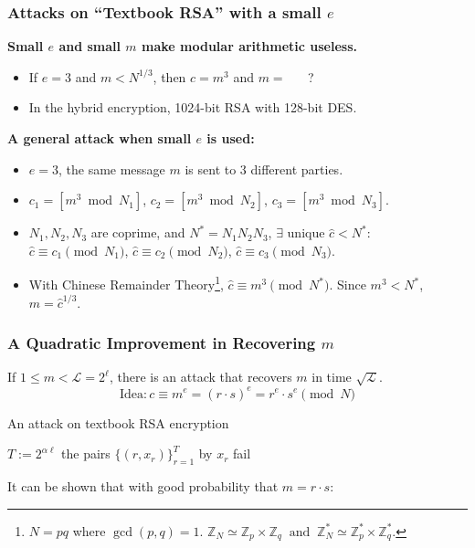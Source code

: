 \begin{frame}\frametitle{Attacks on ``Textbook RSA'' with a small $e$}
\textbf{Small $e$ and small $m$ make modular arithmetic useless.}
\begin{itemize}
\item If $e=3$ and $m < N^{1/3}$, then $c = m^3$ and \alert{$m=$ \underline{$\quad $} ?} %
\item In the hybrid encryption, 1024-bit RSA with 128-bit DES.
\end{itemize}
\textbf{A general attack when small $e$ is used:}
\begin{itemize}
\item $e=3$, the same message $m$ is sent to 3 different parties.
\item $c_1= [ m^3 \bmod N_1]$, $c_2= [ m^3 \bmod N_2]$, $c_3= [ m^3 \bmod N_3]$.
\item $N_1,N_2,N_3$ are coprime, and $N^*=N_1N_2N_3$, $\exists$ unique $\hat{c} < N^*$:\\
$\hat{c} \equiv c_1 \pmod{N_1}$, $\hat{c} \equiv c_2 \pmod{N_2}$, $\hat{c} \equiv c_3 \pmod{N_3}$.
\item With Chinese Remainder Theory\footnote{
$N = pq$ where $\gcd(p,q)=1$.
$\mathbb{Z}_N \simeq \mathbb{Z}_p \times \mathbb{Z}_q\;\;\text{and}\;\;\mathbb{Z}_N^* \simeq \mathbb{Z}_p^* \times \mathbb{Z}_q^* .$
}, $\hat{c} \equiv m^3 \pmod{N^*}$. Since $m^3 < N^*$, $m = \hat{c}^{1/3}$.
\end{itemize}
\end{frame}
\begin{frame}\frametitle{A Quadratic Improvement in Recovering $m$}
If $1 \le m < \mathcal{L} = 2^{\ell}$, there is an attack that recovers $m$  in time $\sqrt{\mathcal{L}}$.
\[ \text{Idea}: c \equiv m^e = (r\cdot s)^e = r^e\cdot s^e \pmod N \]
\begin{algorithm}[H]
\DontPrintSemicolon
\caption{An attack on textbook RSA encryption}
\BlankLine

\KwS $T := 2^{\alpha \ell}$ \;
\;
\KwT the pairs $\{ (r,x_r)\}^T_{r=1}$ by $x_r$\;
\Return fail\;
\end{algorithm}
It can be shown that with good probability that $m=r\cdot s$:
\end{frame}
